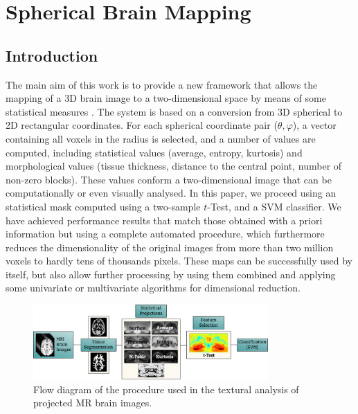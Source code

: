 \chapter{Spherical Brain Mapping}\label{ch:sbm}
\section{Introduction}

The main aim of this work is to provide a new framework that allows the mapping  of a 3D brain image to a two-dimensional space by means of some statistical measures \cite{Martinez-Murcia2015}. The system is based on a conversion from 3D spherical to 2D rectangular coordinates. For each spherical coordinate pair ($\theta,\varphi$), a vector containing all voxels  in the radius is selected, and a number of values are computed, including statistical values (average, entropy, kurtosis) and morphological values (tissue thickness, distance to the central point, number of non-zero blocks). These values conform a two-dimensional image that can be computationally or even visually analysed. In this paper, we proceed using an statistical mask computed using a two-sample $t$-Test, and a SVM classifier. We have achieved performance results that match those obtained with a priori information but using a complete automated procedure, which furthermore reduces the dimensionality of the original images from more than two million voxels to hardly tens of thousands pixels. These maps can be successfully used by itself, but also allow further processing by using them combined and applying some univariate or multivariate algorithms for dimensional reduction. 


\begin{figure}[htp]
	\centering
	\includegraphics[width=0.8\textwidth]{gfx/ch6/01-flowdiagram}
	\caption{Flow diagram of the procedure used in the textural analysis of projected MR brain images.}
	\label{fig:flowdiagram}
\end{figure}

